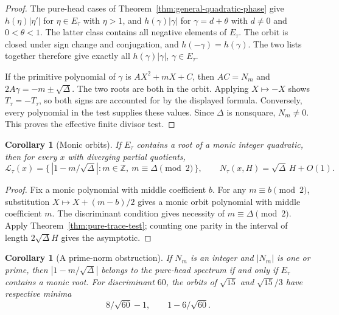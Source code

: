 \documentclass[11pt]{amsart}
\newtheorem{corollary}[theorem]{Corollary}
\theoremstyle{definition}
\theoremstyle{remark}
\numberwithin{equation}{section}
\newcommand{\Z}{\mathbb{Z}}
\begin{document}
\begin{proof}
The pure-head cases of Theorem~\ref{thm:general-quadratic-phase}
give $h(\eta)|\eta'|$ for $\eta\in E_\tau$ with $\eta>1$,
and $h(\gamma)|\gamma|$ for $\gamma=d+\theta$ with $d\ne0$
and $0<\theta<1$. The latter class contains all negative elements
of $E_\tau$. The orbit is closed under sign change and conjugation,
and $h(-\gamma)=h(\gamma)$. The two lists together therefore give
exactly all $h(\gamma)|\gamma|$, $\gamma\in E_\tau$.

If the primitive polynomial of $\gamma$ is $A X^2+mX+C$, then
$AC=N_m$ and $2A\gamma=-m\pm\sqrt\Delta$. The two roots are both
in the orbit. Applying $X\mapsto-X$ shows $T_\tau=-T_\tau$,
so both signs are accounted for by the displayed formula.
Conversely, every polynomial in the test supplies these values.
Since $\Delta$ is nonsquare, $N_m\ne0$. This proves the effective
finite divisor test.
\end{proof}

\begin{corollary}[Monic orbits]\label{cor:principal-orbit-spectrum}
If $E_\tau$ contains a root of a monic integer quadratic, then for
every $x$ with diverging partial quotients,
\[
 \mathcal L_\tau(x)
  =\{\,|1-m/\sqrt\Delta|:m\in\Z,\ m\equiv\Delta\pmod2\,\},
 \qquad N_\tau(x,H)=\sqrt\Delta\,H+O(1).
\]
\end{corollary}

\begin{proof}
Fix a monic polynomial with middle coefficient $b$. For any
$m\equiv b\pmod2$, substitution $X\mapsto X+(m-b)/2$ gives a monic
orbit polynomial with middle coefficient $m$. The discriminant
condition gives necessity of $m\equiv\Delta\pmod2$. Apply
Theorem~\ref{thm:pure-trace-test}; counting one parity in the
interval of length $2\sqrt\Delta H$ gives the asymptotic.
\end{proof}

\begin{corollary}[A prime-norm obstruction]\label{cor:prime-norm-orbit}
If $N_m$ is an integer and $|N_m|$ is one or prime, then
$|1-m/\sqrt\Delta|$ belongs to the pure-head spectrum if and only
if $E_\tau$ contains a monic root.
For discriminant $60$, the orbits of $\sqrt{15}$ and
$\sqrt{15}/3$ have respective minima
\[
 8/\sqrt{60}-1,\qquad 1-6/\sqrt{60}.
\]
\end{corollary}
\end{document}
